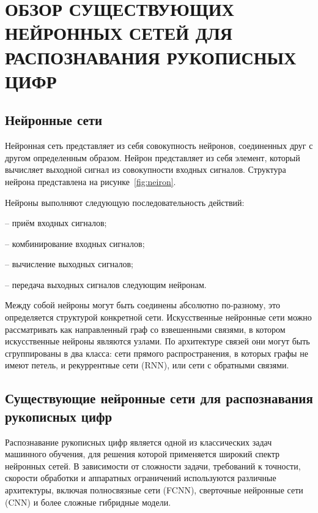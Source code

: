 \chapter[Обзор существующих нейронных сетей для распознавания рукописных цифр]
{ОБЗОР СУЩЕСТВУЮЩИХ НЕЙРОННЫХ СЕТЕЙ ДЛЯ РАСПОЗНАВАНИЯ РУКОПИСНЫХ ЦИФР}

\section{Нейронные сети}\par
\hspace*{12.5 mm}Нейронная сеть представляет из себя совокупность нейронов,
соединенных друг с другом определенным образом. Нейрон представляет из себя 
элемент, который вычисляет выходной сигнал из совокупности входных сигналов.
Структура нейрона представлена на рисунке~\ref{fig:neiron}.


Нейроны выполняют следующую последовательность действий:

– приём входных сигналов;

– комбинирование входных сигналов;

– вычисление выходных сигналов;

– передача выходных сигналов следующим нейронам.

Между собой нейроны могут быть соединены абсолютно по-разному, это
определяется структурой конкретной сети. Искусственные нейронные сети 
можно рассматривать как направленный граф со взвешенными связями, в котором 
искусственные нейроны являются узлами. По архитектуре связей они могут быть 
сгруппированы в два класса: сети прямого распространения, в которых графы не 
имеют петель, и рекуррентные сети (RNN), или сети с обратными связями.

\section{Существующие нейронные сети для распознавания рукописных цифр}\par
\hspace*{12.5 mm}Распознавание рукописных цифр является одной из классических 
задач машинного обучения, для решения которой применяется широкий спектр 
нейронных сетей. В зависимости от сложности задачи, требований к точности, 
скорости обработки и аппаратных ограничений используются различные архитектуры, 
включая полносвязные сети (FCNN), сверточные нейронные сети (CNN) и более 
сложные гибридные модели.

